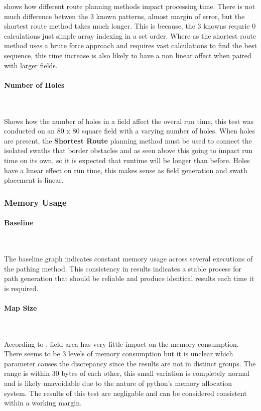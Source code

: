 \documentclass[final]{cmpreport_02}
\begin{document}
 shows how different route planning methods impact processing time.
There is not much difference betwen the 3 known patterns, almost margin of error, but the shortest route method takes much longer.
This is because, the 3 knowns requrie 0 calculations just simple array indexing in a set order.
Where as the shortest route method uses a brute force approach and requires vast calculations to find the best sequence, this time increase is also likely to have a non linear affect when paired with larger fields.

\paragraph{Number of Holes} \

 Shows how the number of holes in a field affect the overal run time, this test was conducted on an 80 x 80 square field with a varying number of holes.
When holes are present, the \textbf{Shortest Route} planning method must be used to connect the isolated swaths that border obstacles and as seen above this going to impact run time on its own, so it is expected that runtime will be longer than before.
Holes have a linear effect on run time, this makes sense as field generation and swath placement is linear.


\subsubsection{Memory Usage}

\paragraph{Baseline} \

The baseline graph  indicates constant memory usage across several executions of the pathing method.
This consistency in results indicates a stable process for path generation that should be reliable and produce identical results each time it is required.

\paragraph{Map Size} \

According to , field area has very little impact on the memory consumption.
There seems to be 3 levels of memory consumption but it is unclear which parameter causes the discrepancy since the results are not in distinct groups.
The range is within 30 bytes of each other, this small variation is completely normal and is likely unavoidable due to the nature of python's memory allocation system.
The results of this test are negligable and can be considered consistent within a working margin.
\end{document}
